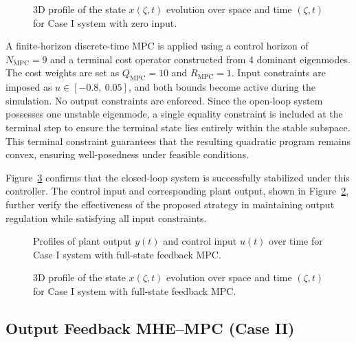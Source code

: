 \begin{figure}[!htbp]
    \centering
    
    \caption{3D profile of the state $x(\zeta, t)$ evolution over space and time $(\zeta, t)$ for Case I system with zero input.}
    \label{fig:openloop_x}
\end{figure}

A finite-horizon discrete-time MPC is applied using a control horizon of $N_{\mathrm{MPC}} = 9$ and a terminal cost operator constructed from 4 dominant eigenmodes. The cost weights are set as $Q_{\mathrm{MPC}} = 10$ and $R_{\mathrm{MPC}} = 1$. Input constraints are imposed as $u \in [-0.8,\ 0.05]$, and both bounds become active during the simulation. No output constraints are enforced. Since the open-loop system possesses one unstable eigenmode, a single equality constraint is included at the terminal step to ensure the terminal state lies entirely within the stable subspace. This terminal constraint guarantees that the resulting quadratic program remains convex, ensuring well-posedness under feasible conditions.

Figure~\ref{fig:MPC_x} confirms that the closed-loop system is successfully stabilized under this controller. The control input and corresponding plant output, shown in Figure~\ref{fig:input_output_MPC}, further verify the effectiveness of the proposed strategy in maintaining output regulation while satisfying all input constraints.

\begin{figure}[!htbp]
    \centering
    
    \caption{Profiles of plant output $y(t)$ and control input $u(t)$ over time for Case I system with full-state feedback MPC.}
    \label{fig:input_output_MPC}
\end{figure}

\begin{figure}[!htbp]
    \centering
    
    \caption{3D profile of the state $x(\zeta, t)$ evolution over space and time $(\zeta, t)$ for Case I system with full-state feedback MPC.}
    \label{fig:MPC_x}
\end{figure}

\subsection{Output Feedback MHE--MPC (Case II)}

